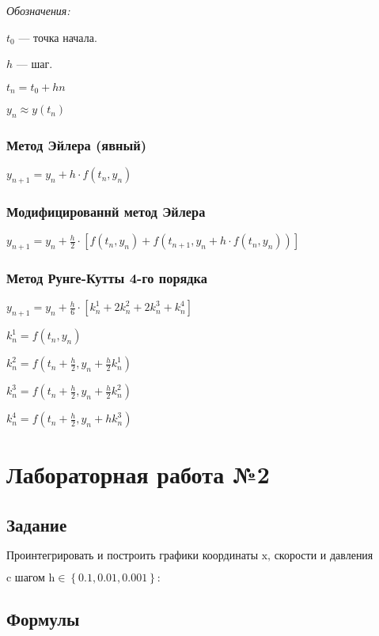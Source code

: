 \documentclass[12pt, a4paper]{article}
\begin{document}
\textit{Обозначения:}

$ t_0 $ --- точка начала.

$ h $ --- шаг.

$t_n = t_0 + hn$

$ y_n \approx y(t_n) $

\subsubsection{Метод Эйлера (явный)}

$ y_{n+1} = y_n + h \cdot f(t_n, y_n) $

\subsubsection{Модифицированнй метод Эйлера}

$ y_{n+1} = y_n + \frac{h}{2} \cdot [f(t_n, y_n) + f(t_{n+1}, y_n + h \cdot f(t_n, y_n))] $

\subsubsection{Метод Рунге-Кутты 4-го порядка}

$ y_{n+1} = y_n + \frac{h}{6} \cdot [k_n^1 + 2k_n^2 + 2k_n^3 + k_n^4] $

$ k_n^1 = f(t_n, y_n) $

$ k_n^2 = f(t_n + \frac{h}{2}, y_n + \frac{h}{2} k_n^1) $

$ k_n^3 = f(t_n + \frac{h}{2}, y_n + \frac{h}{2} k_n^2) $

$ k_n^4 = f(t_n + \frac{h}{2}, y_n + h k_n^3) $


\section{Лабораторная работа №2}

\subsection{Задание}
$ \text{Проинтегрировать и построить графики координаты x, скорости и давления} $

$ \text{c шагом h} \in \left\{ 0.1, 0.01, 0.001 \right\} : $


\subsection{Формулы}
\end{document}
